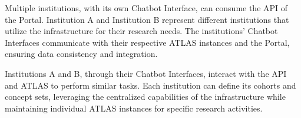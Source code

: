 Multiple institutions, with its own Chatbot Interface, can consume the {\ir} API of the {\ehden} Portal. Institution A and Institution B represent different institutions that utilize the {\ehden} infrastructure for their research needs. The institutions' Chatbot Interfaces communicate with their respective ATLAS instances and the {\ehden} Portal, ensuring data consistency and integration.

Institutions A and B, through their Chatbot Interfaces, interact with the {\ir} API and ATLAS to perform similar tasks. Each institution can define its cohorts and concept sets, leveraging the centralized capabilities of the {\ehden} infrastructure while maintaining individual ATLAS instances for specific research activities.
